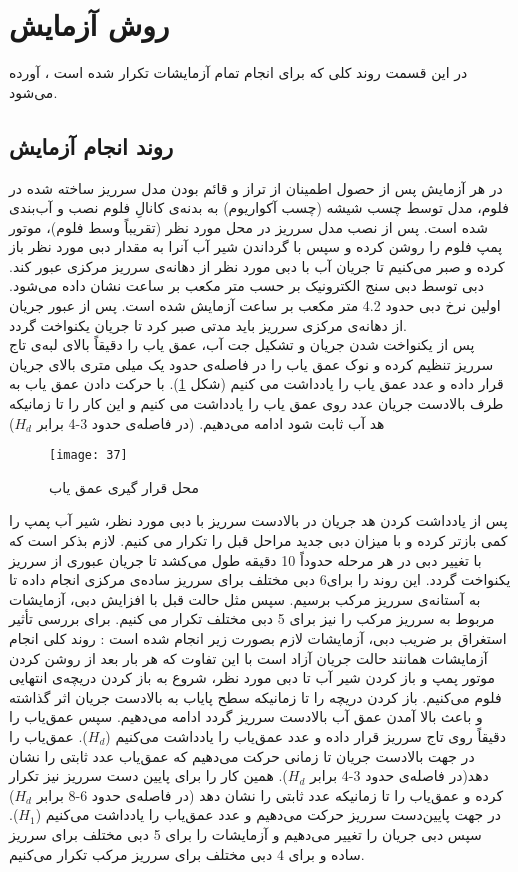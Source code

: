 \section{روش آزمایش}
در این قسمت روند کلی که برای انجام تمام آزمایشات تکرار شده است ، آورده می‌شود. 
\subsection{روند انجام آزمایش}

در هر آزمایش پس از حصول اطمینان از تراز و قائم بودن مدل سرریز ساخته شده در فلوم، مدل توسط چسب شیشه (چسب آکواریوم) به بدنه‌ی کانالِ فلوم نصب و آب‌بندی شده است. پس از نصب مدل سرریز در محل مورد نظر (تقریباً وسط فلوم)، موتور پمپ فلوم را روشن کرده و سپس با گرداندن شیر آب آنرا به مقدار دبی مورد نظر باز کرده و صبر می‌کنیم تا جریان آب با دبی مورد نظر از دهانه‌ی سرریز مرکزی عبور 
کند. دبی توسط دبی سنج الکترونیک بر حسب متر مکعب بر ساعت نشان داده می‌شود. اولین نرخ دبی حدود 4.2 متر مکعب بر ساعت آزمایش شده است. پس از عبور جریان از دهانه‌ی مرکزی سرریز باید مدتی صبر کرد تا جریان یکنواخت گردد. \\
پس از یکنواخت شدن جریان و تشکیل جت آب، عمق یاب را دقیقاً بالای لبه‌ی تاج سرریز تنظیم کرده و نوک عمق یاب را در فاصله‌ی حدود یک میلی متری بالای جریان قرار داده و عدد عمق یاب را یادداشت می کنیم (شکل \ref{fig29}). با حرکت دادن عمق یاب به طرف بالادست جریان عدد روی عمق یاب را یادداشت می کنیم و این کار را تا زمانیکه هد آب ثابت شود ادامه می‌دهیم. (در فاصله‌ی حدود 3-4 برابر $H_d$)
\begin{figure}
 \centering
  \texttt{[image: 37]}
  \caption{محل قرار گیری عمق یاب    }
  \label{fig29}
\end{figure}
پس از یادداشت کردن هد جریان در بالادست سرریز با دبی مورد نظر، شیر آب پمپ را کمی بازتر کرده و با میزان دبی جدید مراحل قبل را تکرار می کنیم. لازم بذکر است که با تغییر دبی در هر مرحله حدوداً 10 دقیقه طول می‌کشد تا جریان عبوری از سرریز یکنواخت گردد.
این روند را برای6 دبی مختلف برای سرریز ساده‌ی مرکزی انجام داده تا به آستانه‌ی سرریز مرکب برسیم. سپس مثل حالت قبل با افزایش دبی، آزمایشات مربوط به سرریز مرکب را نیز برای 5 دبی مختلف تکرار می کنیم.
برای بررسی تأثیر استغراق بر ضریب دبی، آزمایشات لازم بصورت زیر انجام شده است :
روند کلی انجام آزمایشات همانند حالت جریان آزاد است با این تفاوت که هر بار بعد از روشن کردن موتور پمپ و باز کردن شیر آب تا دبی مورد نظر، شروع به باز کردن دریچه‌ی انتهایی فلوم می‌کنیم. باز کردن دریچه را تا زمانیکه سطح پایاب به بالادست جریان اثر گذاشته و باعث بالا آمدن عمق آب بالادست سرریز گردد ادامه می‌دهیم. سپس عمق‌یاب را دقیقاً روی تاج سرریز قرار داده و عدد عمق‌یاب را یادداشت می‌کنیم ($H_d$). عمق‌یاب را در جهت بالادست جریان تا زمانی حرکت می‌دهیم که عمق‌یاب عدد ثابتی را نشان دهد(در فاصله‌ی حدود 3-4 برابر $H_d$). همین کار را برای پایین دست سرریز نیز تکرار کرده و عمق‌یاب را تا زمانیکه عدد ثابتی را نشان دهد (در فاصله‌ی حدود 6-8 برابر $H_d$) در جهت پایین‌دست سرریز  حرکت می‌دهیم و عدد عمق‌یاب را یادداشت می‌کنیم ($H_1$). سپس دبی جریان را تغییر می‌دهیم و آزمایشات را برای 5 دبی مختلف برای سرریز ساده و برای 4 دبی مختلف برای سرریز مرکب تکرار می‌کنیم.
